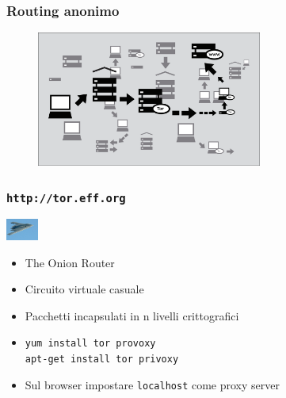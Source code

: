 \documentclass[xcolor=svgnames]{beamer}
\begin{document}
\begin{frame}
	\frametitle{Routing anonimo}

	\begin{figure}[+ht]
			\begin{center}
					\includegraphics[width=280px]{img/tor.png}
			\end{center}
	\end{figure}

\end{frame}

\begin{frame}
	\frametitle{\texttt{http://tor.eff.org}}

	\begin{block}{\includegraphics[width=40px]{img/stealth.jpg}}
			\begin{itemize}
					\item The Onion Router
						\pause
					\item Circuito virtuale casuale
						\pause
					\item Pacchetti incapsulati in n livelli crittografici
						\pause
					\item \texttt{yum install tor provoxy} \\
						  \texttt{apt-get install tor privoxy}
						\pause
					\item Sul browser impostare \texttt{localhost} come proxy server
			\end{itemize}
	\end{block}
						
\end{frame}
\end{document}
